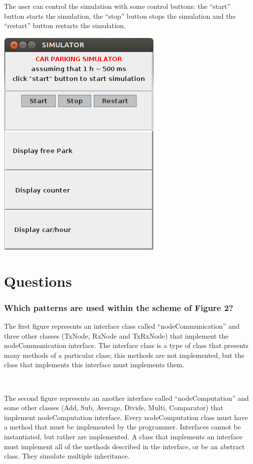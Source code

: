 \documentclass[a4paper,titlepage]{article}
\begin{document}
The user can control the simulation with some control buttons: the ``start'' button starts the simulation, the ``stop'' button stops the simulation and the ``restart'' button restarts the simulation.

    \begin{center}

    \centering
    \includegraphics[scale=0.50]{interface.png}

    \end{center}

 
\newpage
\part{Questions}

\section*{ Which patterns are used within the scheme of Figure 2?}

The first figure represents an interface class called ``nodeCommunication'' and three other classes (TxNode, RxNode and TxRxNode) that implement the nodeCommunication interface. The interface class is a type of class that presents many methods of a particular class; this methods are not implemented, but the class that implements this interface must implements them.

~

The second figure represents an another interface called ``nodeComputation'' and some other classes (Add, Sub, Average, Divide, Multi, Comparator) that implement nodeComputation interface. Every nodeComputation class must have a method that must be implemented by the programmer. Interfaces cannot be instantiated, but rather are implemented. A class that implements an interface must implement all of the methods described in the interface, or be an abstract class. They simulate multiple inheritance.
\end{document}
